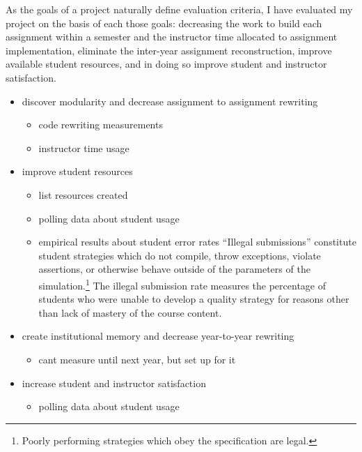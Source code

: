 \documentclass[pageno]{jpaper}
\begin{document}
As the goals of a project naturally define evaluation criteria, I have evaluated my project on the basis of each those goals: decreasing the work to build each assignment within a semester and the instructor time allocated to assignment implementation, eliminate the inter-year assignment reconstruction, improve available student resources, and in doing so improve student and instructor satisfaction.

\begin{itemize}
\item discover modularity and decrease assignment to assignment rewriting
  \begin{itemize}
  \item code rewriting measurements
  \item instructor time usage
  \end{itemize}
\item improve student resources
  \begin{itemize}
  \item list resources created
  \item polling data about student usage
  \item empirical results about student error rates
    ``Illegal submissions'' constitute student strategies which do not compile, throw exceptions, violate assertions, or otherwise behave outside of the parameters of the simulation.\footnote{Poorly performing strategies which obey the specification are legal.}
    The illegal submission rate measures the percentage of students who were unable to develop a quality strategy for reasons other than lack of mastery of the course content.
  \end{itemize}
\item create institutional memory and decrease year-to-year rewriting
  \begin{itemize}
  \item cant measure until next year, but set up for it
  \end{itemize}
\item increase student and instructor satisfaction
  \begin{itemize}
  \item polling data about student usage
  \end{itemize}
\end{itemize}

\end{document}
